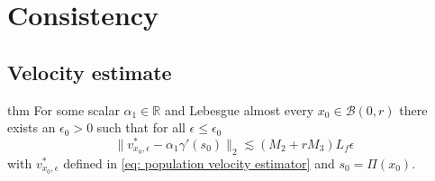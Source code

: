 \documentclass[11pt]{article}
\begin{document}
\section{Consistency}

\subsection{Velocity estimate}

\begin{restatable}{thm}{}\label{thm: population prop}
    For some scalar $\alpha_1 \in \mathbb{R}$ and Lebesgue almost every $x_0 \in \mathcal{B}(0, r)$ there exists an $\epsilon_0 > 0$ such that for all $\epsilon \leq \epsilon_0$ 
    \[\|v^*_{x_0, \epsilon} - \alpha_1\gamma'(s_0)\|_2 \lesssim (M_2+rM_3)L_f\epsilon\]
    with $v^*_{x_0, \epsilon}$ defined in \cref{eq: population velocity estimator} and $s_0 = \Pi(x_0)$.
\end{restatable}
\end{document}
